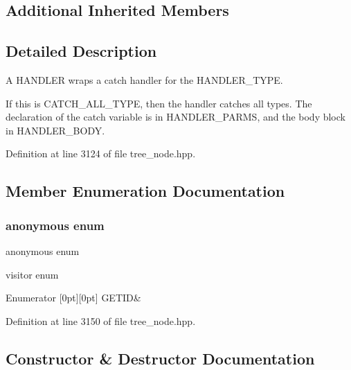 \subsection*{Additional Inherited Members}


\subsection{Detailed Description}
A H\+A\+N\+D\+L\+ER wraps a catch handler for the H\+A\+N\+D\+L\+E\+R\+\_\+\+T\+Y\+PE. 

If this is C\+A\+T\+C\+H\+\_\+\+A\+L\+L\+\_\+\+T\+Y\+PE, then the handler catches all types. The declaration of the catch variable is in H\+A\+N\+D\+L\+E\+R\+\_\+\+P\+A\+R\+MS, and the body block in H\+A\+N\+D\+L\+E\+R\+\_\+\+B\+O\+DY. 

Definition at line 3124 of file tree\+\_\+node.\+hpp.



\subsection{Member Enumeration Documentation}
\mbox{\label{structhandler_a0564a1d2bd04a6cb6212aa5dc7e07be0}} 
\subsubsection{\texorpdfstring{anonymous enum}{anonymous enum}}
{\footnotesize\ttfamily anonymous enum}



visitor enum 

\begin{DoxyEnumFields}{Enumerator}
[0pt][0pt]{}\mbox{\label{structhandler_a0564a1d2bd04a6cb6212aa5dc7e07be0af00e527c188bd59321c377c3f5b56fc4}} 
G\+E\+T\+ID&\\
\hline

\end{DoxyEnumFields}


Definition at line 3150 of file tree\+\_\+node.\+hpp.



\subsection{Constructor \& Destructor Documentation}
\mbox{\label{structhandler_af07eae7d35241a2bc85d8e366e356652}} 

